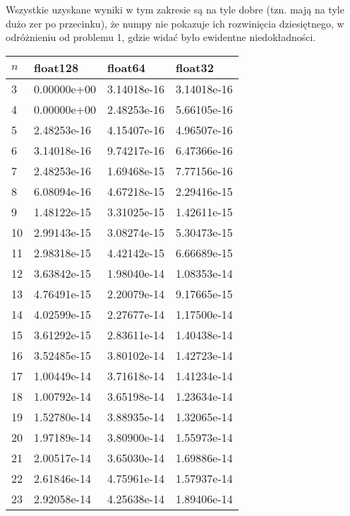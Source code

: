 \documentclass{article}
\begin{document}
Wszystkie uzyskane wyniki w tym zakresie są na tyle dobre (tzn. mają na tyle dużo zer po przecinku),
że numpy nie pokazuje ich rozwinięcia dziesiętnego, w odróżnieniu od problemu 1, gdzie widać było ewidentne
niedokładności.

\newpage
\thispagestyle{empty}

\begin{table}[H]
\parbox{.45\linewidth}{
\hspace*{-2.4cm}
\begin{tabular}{|l|l|l|l|}
\hline
$n$ & float128 & float64 & float32 \\ \hline
3 & 0.00000e+00 & 3.14018e-16 & 3.14018e-16 \\ \hline
4 & 0.00000e+00 & 2.48253e-16 & 5.66105e-16 \\ \hline
5 & 2.48253e-16 & 4.15407e-16 & 4.96507e-16 \\ \hline
6 & 3.14018e-16 & 9.74217e-16 & 6.47366e-16 \\ \hline
7 & 2.48253e-16 & 1.69468e-15 & 7.77156e-16 \\ \hline
8 & 6.08094e-16 & 4.67218e-15 & 2.29416e-15 \\ \hline
9 & 1.48122e-15 & 3.31025e-15 & 1.42611e-15 \\ \hline
10 & 2.99143e-15 & 3.08274e-15 & 5.30473e-15 \\ \hline
11 & 2.98318e-15 & 4.42142e-15 & 6.66689e-15 \\ \hline
12 & 3.63842e-15 & 1.98040e-14 & 1.08353e-14 \\ \hline
13 & 4.76491e-15 & 2.20079e-14 & 9.17665e-15 \\ \hline
14 & 4.02599e-15 & 2.27677e-14 & 1.17500e-14 \\ \hline
15 & 3.61292e-15 & 2.83611e-14 & 1.40438e-14 \\ \hline
16 & 3.52485e-15 & 3.80102e-14 & 1.42723e-14 \\ \hline
17 & 1.00449e-14 & 3.71618e-14 & 1.41234e-14 \\ \hline
18 & 1.00792e-14 & 3.65198e-14 & 1.23634e-14 \\ \hline
19 & 1.52780e-14 & 3.88935e-14 & 1.32065e-14 \\ \hline
20 & 1.97189e-14 & 3.80900e-14 & 1.55973e-14 \\ \hline
21 & 2.00517e-14 & 3.65030e-14 & 1.69886e-14 \\ \hline
22 & 2.61846e-14 & 4.75961e-14 & 1.57937e-14 \\ \hline
23 & 2.92058e-14 & 4.25638e-14 & 1.89406e-14 \\ \hline

\end{tabular}}
\end{table}
\end{document}
